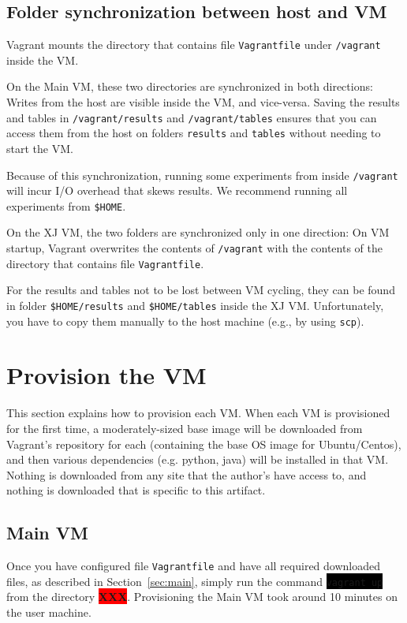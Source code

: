 \documentclass[12pt]{article}
\newcommand{\command}[1]{\colorbox{black}{\texttt{\color{white}#1}}}
\newcommand{\host}[1]{\colorbox{blue!20}{\texttt{\color{black}#1}}}
\newcommand{\vm}[1]{\colorbox{green!20}{\texttt{\color{black}#1}}}
\newcommand{\XXX}{\colorbox{red}{\bf\color{white}XXX}}
\begin{document}
\subsection{Folder synchronization between host and VM}
\label{sec:sync}

Vagrant mounts the directory that contains file \host{Vagrantfile} under
\vm{/vagrant} inside the VM.

On the Main VM, these two directories are synchronized in both directions:
Writes from the host are visible inside the VM, and vice-versa.  Saving the
results and tables in \vm{/vagrant/results} and \vm{/vagrant/tables}
ensures that you can access them from the host on folders \host{results} and
\host{tables} without needing to start the VM.

Because of this synchronization, running some experiments from inside
\vm{/vagrant} will incur I/O overhead that skews results.  We recommend
running all experiments from \vm{\$HOME}.

On the XJ VM, the two folders are synchronized only in one direction:  On VM
startup, Vagrant overwrites the contents of \vm{/vagrant} with the contents
of the directory that contains file \host{Vagrantfile}.

For the results and tables not to be lost between VM cycling, they can be found
in folder \vm{\$HOME/results} and \vm{\$HOME/tables} inside the XJ VM.
Unfortunately, you have to copy them manually to the host machine (e.g., by
using \texttt{scp}).

\section{Provision the VM}
\label{sec:provision}

This section explains how to provision each VM. When each VM is provisioned for the first time, a moderately-sized base image will be downloaded from Vagrant's repository for each (containing the base OS image for Ubuntu/Centos), and then various dependencies (e.g. python, java) will be installed in that VM. Nothing is downloaded from any site that the author's have access to, and nothing is downloaded that is specific to this artifact.

\subsection{Main VM}

Once you have configured file \host{Vagrantfile} and have all required
downloaded files, as described in Section~\ref{sec:main}, simply run the command
\command{vagrant up} from the directory \XXX.  Provisioning the Main VM took around 10
minutes on the user machine.
\end{document}
